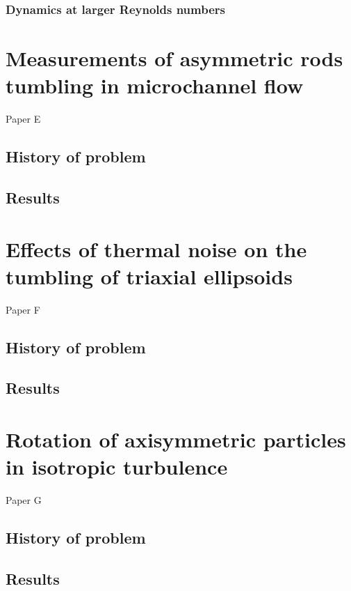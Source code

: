 \documentclass[thesis.tex]{subfiles}
\begin{document}
\subsection{Dynamics at larger Reynolds numbers}



\chapter{Measurements of asymmetric rods tumbling in microchannel flow}
Paper E
\section{History of problem}
\section{Results}
\chapter{Effects of thermal noise on the tumbling of triaxial ellipsoids}
Paper F
\section{History of problem}
\section{Results}
\chapter{Rotation of axisymmetric particles in isotropic turbulence}
Paper G
\section{History of problem}
\section{Results}
\end{document}
